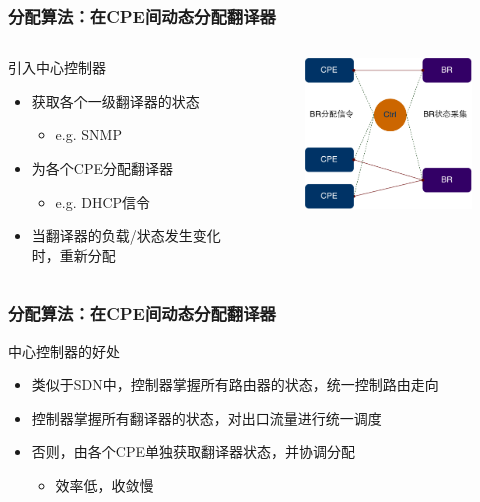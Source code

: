\documentclass{beamer}
\begin{document}
\begin{frame}
  \frametitle{分配算法：在CPE间动态分配翻译器}
  \begin{columns}
  \begin{block}{引入中心控制器}
    \begin{itemize}
    \item 获取各个一级翻译器的状态
    \begin{itemize}
    \item e.g. SNMP
    \end{itemize}
    \item 为各个CPE分配翻译器
    \begin{itemize}
    \item e.g. DHCP信令
    \end{itemize}
    \item 当翻译器的负载/状态发生变化时，重新分配
    \end{itemize}
  \end{block}
    \begin{figure}[ht]
      \begin{center}
        \includegraphics[width=15em]{figs/BR-delegation-centralized.pdf}  
      \end{center}
    \end{figure}
  \end{columns}
\end{frame}

\begin{frame}
  \frametitle{分配算法：在CPE间动态分配翻译器}
  \begin{block}{中心控制器的好处}
    \begin{itemize}
    \item 类似于SDN中，控制器掌握所有路由器的状态，统一控制路由走向
    \item 控制器掌握所有翻译器的状态，对出口流量进行统一调度
    \item 否则，由各个CPE单独获取翻译器状态，并协调分配
      \begin{itemize}
      \item 效率低，收敛慢
      \end{itemize}
    \end{itemize}
  \end{block}
\end{frame}
\end{document}
